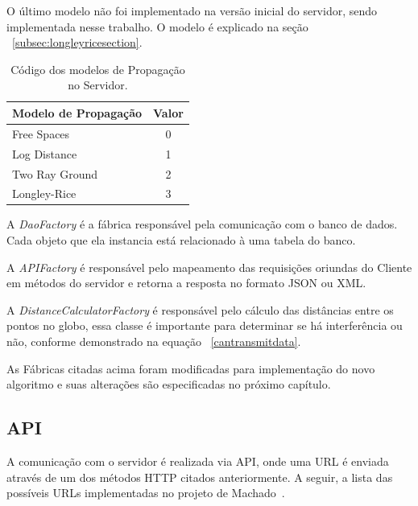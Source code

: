 O último modelo não foi implementado na versão inicial do servidor, sendo implementada nesse trabalho. O modelo é explicado na seção ~\ref{subsec:longleyricesection}.

\begin{table}[modelnumbers]
\centering
\caption[Código dos modelos de Propagação no Servidor.]
{Código dos modelos de Propagação no Servidor.} 
\label{table:modelnumbers}
\begin{tabular}{lc}
Modelo de Propagação          & Valor            \\ \hline
Free Spaces                   & 0                \\
Log Distance                  & 1                \\
Two Ray Ground                & 2                \\
Longley-Rice                  & 3                        
\end{tabular}
\end{table}

A \textit{DaoFactory} é a fábrica responsável pela comunicação com o banco de dados. Cada objeto que ela instancia está relacionado à uma tabela do banco.

A \textit{APIFactory} é responsável pelo mapeamento das requisições oriundas do Cliente em métodos do servidor e retorna a resposta no formato JSON ou XML.

A \textit{DistanceCalculatorFactory} é responsável pelo cálculo das distâncias entre os pontos no globo, essa classe é importante para determinar se há interferência ou não, conforme demonstrado na equação ~\ref{cantransmitdata}.

As Fábricas citadas acima foram modificadas para implementação do novo algoritmo e suas alterações são especificadas no próximo capítulo.

\subsection{API}

A comunicação com o servidor é realizada via API, onde uma URL é enviada através de um dos métodos HTTP citados anteriormente. A seguir, a lista das possíveis URLs implementadas no projeto de Machado~\cite{tccmarcelo}. 

